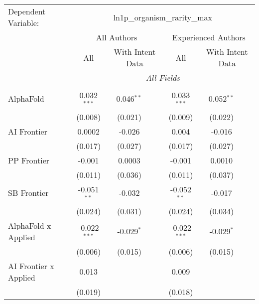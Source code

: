 \begingroup
\centering
\begin{tabular}{lcccccc}
   \tabularnewline \midrule \midrule
   Dependent Variable: & \multicolumn{6}{c}{ln1p\_organism\_rarity\_max}\\
 & \multicolumn{3}{c}{All Authors} & \multicolumn{3}{c}{Experienced Authors} \\
\cmidrule(lr){2-4} \cmidrule(lr){5-7}
 & \multicolumn{1}{c}{All} & \multicolumn{2}{c}{With Intent Data} & \multicolumn{1}{c}{All} & \multicolumn{2}{c}{With Intent Data} \\
\cmidrule(lr){2-2} \cmidrule(lr){3-4} \cmidrule(lr){5-5} \cmidrule(lr){6-7}
 & \multicolumn{6}{c}{\textit{All Fields}} \\ \\
   AlphaFold                      & 0.032$^{***}$  & 0.046$^{**}$ &             & 0.033$^{***}$  & 0.052$^{**}$ &   \\   
                                  & (0.008)        & (0.021)      &             & (0.009)        & (0.022)      &   \\   
   AI Frontier                    & 0.0002         & -0.026       &             & 0.004          & -0.016       &   \\   
                                  & (0.017)        & (0.027)      &             & (0.017)        & (0.027)      &   \\   
   PP Frontier                    & -0.001         & 0.0003       &             & -0.001         & 0.0010       &   \\   
                                  & (0.011)        & (0.036)      &             & (0.011)        & (0.037)      &   \\   
   SB Frontier                    & -0.051$^{**}$  & -0.032       &             & -0.052$^{**}$  & -0.017       &   \\   
                                  & (0.024)        & (0.031)      &             & (0.024)        & (0.034)      &   \\   
   AlphaFold x Applied            & -0.022$^{***}$ & -0.029$^{*}$ &             & -0.022$^{***}$ & -0.029$^{*}$ &   \\   
                                  & (0.006)        & (0.015)      &             & (0.006)        & (0.015)      &   \\   
   AI Frontier x Applied          & 0.013          &              &             & 0.009          &              &   \\   
                                  & (0.019)        &              &             & (0.018)        &              &   \\   

\end{tabular}
